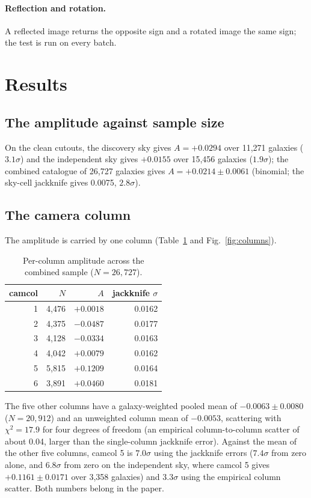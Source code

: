 \documentclass[linenumbers]{aa}
\begin{document}
\paragraph{Reflection and rotation.} A reflected image returns the opposite sign and a rotated
image the same sign; the test is run on every batch.

\section{Results}

\subsection{The amplitude against sample size}
On the clean cutouts, the discovery sky gives $A = +0.0294$ over 11,271 galaxies ($3.1\sigma$) and
the independent sky gives $+0.0155$ over 15,456 galaxies ($1.9\sigma$); the combined catalogue of
26,727 galaxies gives $A = +0.0214 \pm 0.0061$ (binomial; the sky-cell jackknife gives 0.0075,
$2.8\sigma$).

\subsection{The camera column}
The amplitude is carried by one column (Table~\ref{tab:columns} and Fig.~\ref{fig:columns}).

\begin{table}[h]
\centering
\caption{Per-column amplitude across the combined sample ($N = 26,727$).}
\label{tab:columns}
\begin{tabular}{rrrr}
\toprule
camcol & $N$ & $A$ & jackknife $\sigma$ \\
\midrule
1 & 4,476 & $+0.0018$ & 0.0162 \\
2 & 4,375 & $-0.0487$ & 0.0177 \\
3 & 4,128 & $-0.0334$ & 0.0163 \\
4 & 4,042 & $+0.0079$ & 0.0162 \\
5 & 5,815 & $+0.1209$ & 0.0164 \\
6 & 3,891 & $+0.0460$ & 0.0181 \\
\bottomrule
\end{tabular}
\end{table}

The five other columns have a galaxy-weighted pooled mean of $-0.0063 \pm 0.0080$ ($N = 20,912$)
and an unweighted column mean of $-0.0053$, scattering with $\chi^2 = 17.9$ for four degrees of
freedom (an empirical column-to-column scatter of about 0.04, larger than the single-column
jackknife error). Against the mean of the other five columns, camcol 5 is $7.0\sigma$ using the
jackknife errors ($7.4\sigma$ from zero alone, and $6.8\sigma$ from zero on the independent sky,
where camcol 5 gives $+0.1161 \pm 0.0171$ over 3,358 galaxies) and $3.3\sigma$ using the empirical
column scatter. Both numbers
belong in the paper.
\end{document}

